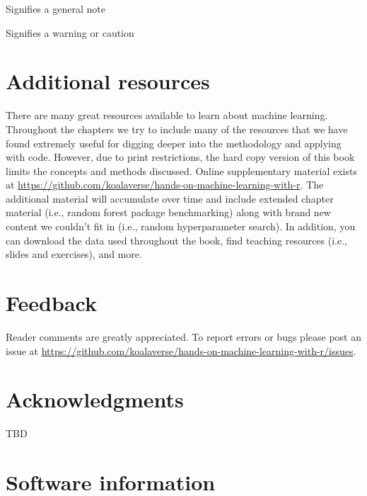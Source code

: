 \documentclass[]{krantz}
\makeatletter
\newenvironment{kframe}{%
\medskip{}
\setlength{\fboxsep}{.8em}
 \def\at@end@of@kframe{}%
 \ifinner\ifhmode%
  \def\at@end@of@kframe{\end{minipage}}%
  \begin{minipage}{\columnwidth}%
 \fi\fi%
 \def\FrameCommand##1{\hskip\@totalleftmargin \hskip-\fboxsep
 \colorbox{shadecolor}{##1}\hskip-\fboxsep
     \hskip-\linewidth \hskip-\@totalleftmargin \hskip\columnwidth}%
 \MakeFramed {\advance\hsize-\width
   \@totalleftmargin\z@ \linewidth\hsize
   \@setminipage}}%
 {\par\unskip\endMakeFramed%
 \at@end@of@kframe}
\newenvironment{block}[1]
  {
  \begin{itemize}
  \renewcommand{\labelitemi}{
    \raisebox{-.7\height}[0pt][0pt]{
      {\setkeys{Gin}{width=3em,keepaspectratio}\texttt{[image: icons/\#1]}}
    }
  }
  \setlength{\fboxsep}{1em}
  \begin{kframe}
  \item
  }
  {
  \end{kframe}
  \end{itemize}
  }
\newenvironment{note}
  {\begin{block}{note}}
  {\end{block}}
\newenvironment{warning}
  {\begin{block}{warning}}
  {\end{block}}
\makeatother
\begin{document}
\begin{note}
Signifies a general note
\end{note}

\begin{warning}
Signifies a warning or caution
\end{warning}

\hypertarget{additional-resources}{%
\section*{Additional resources}\label{additional-resources}}


There are many great resources available to learn about machine learning. Throughout the chapters we try to include many of the resources that we have found extremely useful for digging deeper into the methodology and applying with code. However, due to print restrictions, the hard copy version of this book limits the concepts and methods discussed. Online supplementary material exists at \url{https://github.com/koalaverse/hands-on-machine-learning-with-r}. The additional material will accumulate over time and include extended chapter material (i.e., random forest package benchmarking) along with brand new content we couldn't fit in (i.e., random hyperparameter search). In addition, you can download the data used throughout the book, find teaching resources (i.e., slides and exercises), and more.

\hypertarget{feedback}{%
\section*{Feedback}\label{feedback}}


Reader comments are greatly appreciated. To report errors or bugs please post an issue at \url{https://github.com/koalaverse/hands-on-machine-learning-with-r/issues}.

\hypertarget{acknowledgments}{%
\section*{Acknowledgments}\label{acknowledgments}}


TBD

\hypertarget{software-information}{%
\section*{Software information}\label{software-information}}
\end{document}
